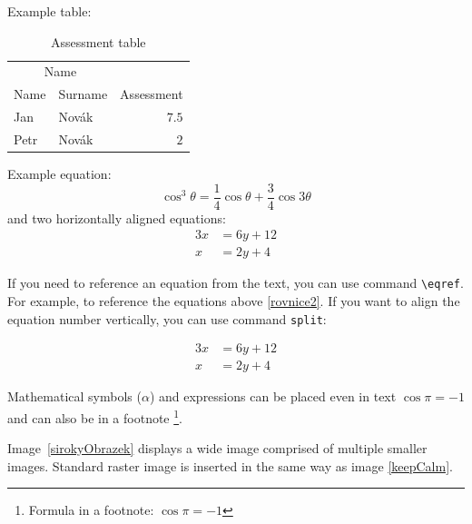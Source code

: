 
Example table:
\begin{table}[H]
	\vskip6pt
	\caption{Assessment table}
    \vskip6pt
	\centering
	\begin{tabular}{llr}
		\toprule
		\multicolumn{2}{c}{Name} \\
		\cmidrule(r){1-2}
		Name & Surname & Assessment \\
		\midrule
		Jan & Novák & $7.5$ \\
		Petr & Novák & $2$ \\
		\bottomrule
	\end{tabular}
	\label{tab:ExampleTable}
\end{table}


\noindent Example equation:
\begin{equation}
\cos^3 \theta =\frac{1}{4}\cos\theta+\frac{3}{4}\cos 3\theta
\label{rovnice2}
\end{equation}
and two horizontally aligned equations: %
\begin{align} \label{eq:soustava}
	3x &= 6y + 12 \\
	x &= 2y + 4 
\end{align}

If you need to reference an equation from the text, you can use command \verb|\eqref|. For example, to reference the equations above \eqref{rovnice2}. If you want to align the equation number vertically, you can use command \texttt{split}:

\begin{equation} \label{eq:soustavaSrovnana}
\begin{split}
	3x &= 6y + 12 \\
	x &= 2y + 4
\end{split}
\end{equation}

Mathematical symbols ($\alpha$) and expressions can be placed even in text $\cos\pi=-1$ and can also be in a footnote%
\footnote{Formula in a footnote: $\cos\pi=-1$}.

Image~\ref{sirokyObrazek} displays a wide image comprised of multiple smaller images. Standard raster image is inserted in the same way as image \ref{keepCalm}.

